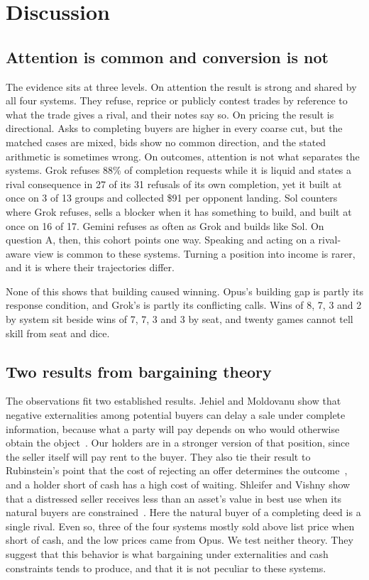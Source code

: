\section{Discussion}
\label{sec:discussion}

\subsection{Attention is common and conversion is not}

The evidence sits at three levels. On attention the result is strong and shared by all four systems. They refuse, reprice or publicly contest trades by reference to what the trade gives a rival, and their notes say so. On pricing the result is directional. Asks to completing buyers are higher in every coarse cut, but the matched cases are mixed, bids show no common direction, and the stated arithmetic is sometimes wrong. On outcomes, attention is not what separates the systems. Grok refuses 88\% of completion requests while it is liquid and states a rival consequence in 27 of its 31 refusals of its own completion, yet it built at once on 3 of 13 groups and collected \$91 per opponent landing. Sol counters where Grok refuses, sells a blocker when it has something to build, and built at once on 16 of 17. Gemini refuses as often as Grok and builds like Sol. On question A, then, this cohort points one way. Speaking and acting on a rival-aware view is common to these systems. Turning a position into income is rarer, and it is where their trajectories differ.

None of this shows that building caused winning. Opus's building gap is partly its response condition, and Grok's is partly its conflicting calls. Wins of 8, 7, 3 and 2 by system sit beside wins of 7, 7, 3 and 3 by seat, and twenty games cannot tell skill from seat and dice.

\subsection{Two results from bargaining theory}

The observations fit two established results. Jehiel and Moldovanu show that negative externalities among potential buyers can delay a sale under complete information, because what a party will pay depends on who would otherwise obtain the object~\cite{jehiel1995delay}. Our holders are in a stronger version of that position, since the seller itself will pay rent to the buyer. They also tie their result to Rubinstein's point that the cost of rejecting an offer determines the outcome~\cite{rubinstein1982perfect}, and a holder short of cash has a high cost of waiting. Shleifer and Vishny show that a distressed seller receives less than an asset's value in best use when its natural buyers are constrained~\cite{shleifer1992liquidation,shleifer2011firesales}. Here the natural buyer of a completing deed is a single rival. Even so, three of the four systems mostly sold above list price when short of cash, and the low prices came from Opus. We test neither theory. They suggest that this behavior is what bargaining under externalities and cash constraints tends to produce, and that it is not peculiar to these systems.

